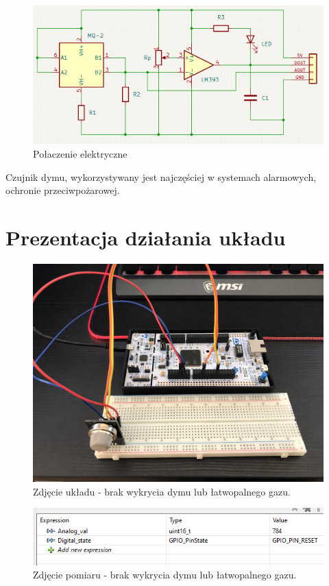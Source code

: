 \documentclass[11pt, a4paper]{article}
\begin{document}
\vspace{0.5cm}
\begin{figure}[h!]
    \centering
    \includegraphics[width=\linewidth]{fig/element/kicadfot.png}
    \caption{Połaczenie elektryczne}
    \label{fig:my_label}
\end{figure}
\vspace{0.5cm}

Czujnik dymu, wykorzystywany jest najczęściej w systemach alarmowych, ochronie przeciwpożarowej.

\newpage
\section{Prezentacja działania układu}

\vspace{0.5cm}
\begin{figure}[h!]
    \centering
    \includegraphics[width=\textwidth]{fig/element/off.png}
    \caption{Zdjęcie układu - brak wykrycia dymu lub łatwopalnego gazu.}
    \label{fig:my_label}
\end{figure}
\vspace{0.5cm}
\begin{figure}[h!]
    \centering
    \includegraphics[width=\textwidth]{fig/element/sensoff.png}
    \caption{Zdjęcie pomiaru - brak wykrycia dymu lub łatwopalnego gazu.}
    \label{fig:my_label}
\end{figure}
\end{document}
